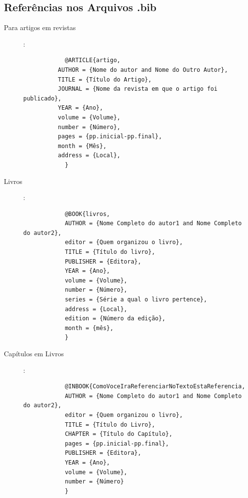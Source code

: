 

\begin{apendicesenv}


\chapter{Referências nos Arquivos .bib}\label{ApeExe}
\thispagestyle{empty}


\begin{description}
	\item[Para artigos em revistas ]:
		\small
		\begin{verbatim}
			@ARTICLE{artigo,
  		  AUTHOR = {Nome do autor and Nome do Outro Autor},
  		  TITLE = {Título do Artigo},
  		  JOURNAL = {Nome da revista em que o artigo foi publicado},
  		  YEAR = {Ano},
  		  volume = {Volume},
  		  number = {Número},
  		  pages = {pp.inicial-pp.final},
  		  month = {Mês},
  		  address = {Local},
			}
		\end{verbatim}

	\item[Livros]:
		\small
		\begin{verbatim}
			@BOOK{livros,
  			AUTHOR = {Nome Completo do autor1 and Nome Completo do autor2},
  			editor = {Quem organizou o livro},
  			TITLE = {Título do livro},
  			PUBLISHER = {Editora},
  			YEAR = {Ano},
  			volume = {Volume},
  			number = {Número},
  			series = {Série a qual o livro pertence},
  			address = {Local},
  			edition = {Número da edição},
  			month = {mês},
			}
		\end{verbatim}

	\item[Capítulos em Livros ]:
		\small
		\begin{verbatim}
			@INBOOK{ComoVoceIraReferenciarNoTextoEstaReferencia,
  			AUTHOR = {Nome Completo do autor1 and Nome Completo do autor2},
  			editor = {Quem organizou o livro},
  			TITLE = {Título do Livro},
  			CHAPTER = {Título do Capítulo},
  			pages = {pp.inicial-pp.final},
  			PUBLISHER = {Editora},
  			YEAR = {Ano},
  			volume = {Volume},	
  			number = {Número}
			}
		\end{verbatim}
		
	
\end{description}


\end{apendicesenv}